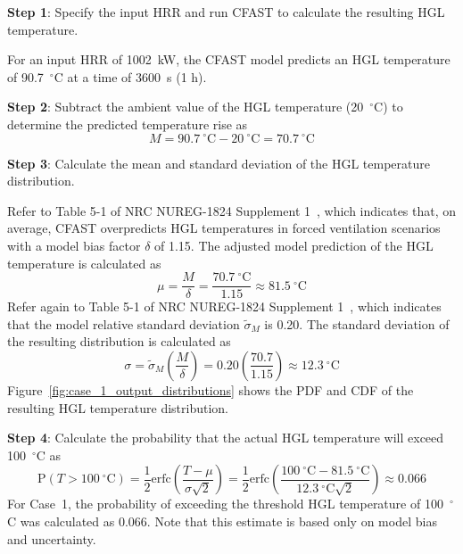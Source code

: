 \documentclass[12pt]{article}
\begin{document}
\textbf{Step 1}: Specify the input HRR and run CFAST to calculate the resulting HGL temperature.

For an input HRR of 1002~kW, the CFAST model predicts an HGL temperature of 90.7~$^\circ$C at a time of 3600~s (1 h).

\textbf{Step 2}: Subtract the ambient value of the HGL temperature (20~$^\circ$C) to determine the predicted temperature rise as
\begin{equation}
M = 90.7~^\circ\textrm{C} - 20~^\circ\textrm{C} = 70.7~^\circ\textrm{C}
\end{equation}

\textbf{Step 3}: Calculate the mean and standard deviation of the HGL temperature distribution.

Refer to Table 5-1 of NRC NUREG-1824 Supplement 1~\cite{NUREG_1824_Sup_1}, which indicates that, on average, CFAST overpredicts HGL temperatures in forced ventilation scenarios with a model bias factor $\delta$ of 1.15. The adjusted model prediction of the HGL temperature is calculated as
\begin{equation}
\mu = \frac{M}{\delta} = \frac{70.7~^\circ\textrm{C}}{1.15} \approx 81.5~^\circ\textrm{C}
\end{equation}
Refer again to Table 5-1 of NRC NUREG-1824 Supplement 1~\cite{NUREG_1824_Sup_1}, which indicates that the model relative standard deviation $\widetilde\sigma_M$ is 0.20. The standard deviation of the resulting distribution is calculated as
\begin{equation}
\sigma = \widetilde\sigma_M \left( \frac{M}{\delta} \right) = 0.20 \left( \frac{70.7}{1.15} \right) \approx 12.3~^\circ\textrm{C}
\end{equation}
Figure~\ref{fig:case_1_output_distributions} shows the PDF and CDF of the resulting HGL temperature distribution.

\textbf{Step 4}: Calculate the probability that the actual HGL temperature will exceed 100~$^\circ$C as
\begin{equation}
\textrm{P}(T > 100~^\circ\textrm{C}) = \frac{1}{2} \textrm{erfc} \left( \frac{T - \mu}{\sigma \sqrt{2}} \right) = \frac{1}{2} \textrm{erfc} \left( \frac{100~^\circ\textrm{C} - 81.5~^\circ\textrm{C}}{12.3~^\circ\textrm{C} \sqrt{2}} \right) \approx 0.066
\end{equation}
For Case~1, the probability of exceeding the threshold HGL temperature of 100~$^\circ$C was calculated as 0.066. Note that this estimate is based only on model bias and uncertainty.
\end{document}
